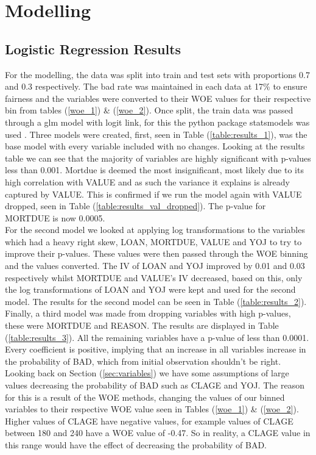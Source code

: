 \chapter{Modelling} \label{chapter:4}

\section{Logistic Regression Results}

For the modelling, the data was split into train and test sets with proportions 0.7 and 0.3 respectively. The bad rate was maintained in each data at 17\% to ensure fairness and the variables were converted to their WOE values for their respective bin from tables  (\ref{woe_1}) \& (\ref{woe_2}). Once split, the train data was passed through a glm model with logit link, for this the python package statsmodels was used \parencite{statsmodels}. Three models were created, first, seen in Table (\ref{table:results_1}), was the base model with every variable included with no changes. Looking at the results table we can see that the majority of variables are highly significant with p-values less than 0.001. Mortdue is deemed the most insignificant, most likely due to its high correlation with VALUE and as such the variance it explains is already captured by VALUE. This is confirmed if we run the model again with VALUE dropped, seen in Table (\ref{table:results_val_dropped}). The p-value for MORTDUE is now 0.0005. \\

For the second model we looked at applying log transformations to the variables which had a heavy right skew, LOAN, MORTDUE, VALUE and YOJ to try to improve their p-values. These values were then passed through the WOE binning and the values converted. The IV of LOAN and YOJ improved by 0.01 and 0.03 respectively whilst MORTDUE and VALUE's IV decreased, based on this, only the log transformations of LOAN and YOJ were kept and used for the second model. The results for the second model can be seen in Table (\ref{table:results_2}). \\

Finally, a third model was made from dropping variables with high p-values, these were MORTDUE and REASON. The results are displayed in Table (\ref{table:results_3}). All the remaining variables have a p-value of less than 0.0001. Every coefficient is positive, implying that an increase in all variables increase in the probability of BAD, which from initial observation shouldn't be right. Looking back on Section (\ref{sec:variables}) we have some assumptions of large values decreasing the probability of BAD such as CLAGE and YOJ. The reason for this is a result of the WOE methods, changing the values of our binned variables to their respective WOE value seen in Tables (\ref{woe_1}) \& (\ref{woe_2}). Higher values of CLAGE have negative values, for example values of CLAGE between 180 and 240 have a WOE value of -0.47. So in reality, a CLAGE value in this range would have the effect of decreasing the probability of BAD. \\

